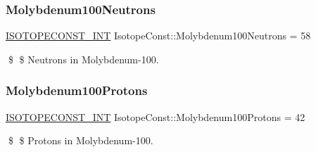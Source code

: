 \subsubsection{\texorpdfstring{Molybdenum100\+Neutrons}{Molybdenum100Neutrons}}
{\footnotesize\ttfamily \mbox{\hyperlink{group___isotope_const-_macros_ga5f18360b3e99483a35c32d789e62621c}{I\+S\+O\+T\+O\+P\+E\+C\+O\+N\+S\+T\+\_\+\+I\+NT}} Isotope\+Const\+::\+Molybdenum100\+Neutrons = 58}

\$ \$ Neutrons in Molybdenum-\/100. \mbox{\label{group___isotope_const-_molybdenum-_mo100_ga68781c237b3e0ff958a17bc422398906}} 
\subsubsection{\texorpdfstring{Molybdenum100\+Protons}{Molybdenum100Protons}}
{\footnotesize\ttfamily \mbox{\hyperlink{group___isotope_const-_macros_ga5f18360b3e99483a35c32d789e62621c}{I\+S\+O\+T\+O\+P\+E\+C\+O\+N\+S\+T\+\_\+\+I\+NT}} Isotope\+Const\+::\+Molybdenum100\+Protons = 42}

\$ \$ Protons in Molybdenum-\/100. 